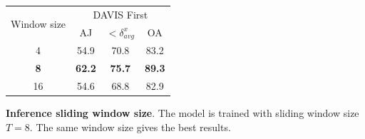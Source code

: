 \begin{tabular}{ cccc }
\toprule
 \multirow{2}{*}{Window size} & \multicolumn{3}{c}{DAVIS First} \\
\cmidrule(lr){2-4}
                              & AJ                              &  \! \! \! $< \delta^x_{avg}$\! & OA            \\
\midrule
4                             & 54.9                            &  70.8                          & 83.2          \\
\textbf{8}                    & \textbf{62.2}                   &  \textbf{75.7}                 & \textbf{89.3} \\
16                            & 54.6                            &  68.8                          & 82.9          \\
\bottomrule
\end{tabular}
\caption{\textbf{Inference sliding window size}. The model is trained with sliding window size $T=8$.
The same window size gives the best results.}%
\label{tab:tab_inf_sliding_window_len_ablation}
\vspace{2em}

